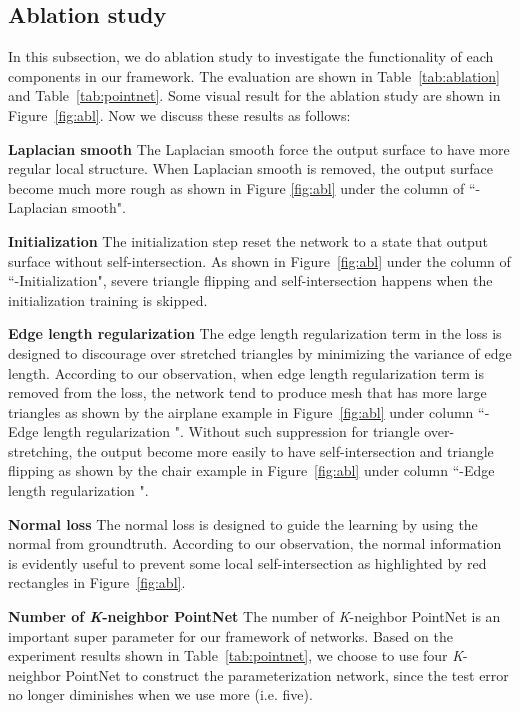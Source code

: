 \subsection{Ablation study}
In this subsection, we do ablation study to investigate the functionality of each components in our framework. The evaluation are shown in Table~\ref{tab:ablation} and Table~\ref{tab:pointnet}. Some visual result for the ablation study are shown in Figure~\ref{fig:abl}. Now we discuss these results as follows:

\noindent\textbf{Laplacian smooth}
The Laplacian smooth force the output surface to have more regular local structure. When Laplacian smooth is removed, the output surface become much more rough as shown in Figure \ref{fig:abl} under the column of ``-Laplacian smooth".

\noindent\textbf{Initialization}
The initialization step reset the network to a state that output surface without self-intersection. As shown in Figure~\ref{fig:abl} under the column of ``-Initialization",  severe triangle flipping and self-intersection happens when the initialization training is skipped.

\noindent\textbf{Edge length regularization}
The edge length regularization term in the loss is designed to discourage over stretched triangles by minimizing the variance of edge length. According to our observation, when edge length regularization term is removed from the loss, the network tend to produce mesh that has  more large triangles as shown by the airplane example in Figure~\ref{fig:abl} under column ``-Edge length regularization ". Without such suppression for triangle over-stretching, the output become more easily to have self-intersection and triangle flipping as shown by the chair example in Figure~\ref{fig:abl} under column ``-Edge length regularization ".

\noindent\textbf{Normal loss}
The normal loss is designed to guide the learning by using the normal from groundtruth. According to our observation, the normal information is evidently useful to prevent some local self-intersection as highlighted by red rectangles in Figure~\ref{fig:abl}.

\noindent\textbf{Number of \textit{K}-neighbor PointNet}
The number of \textit{K}-neighbor PointNet is an important super parameter for our framework of networks. Based on the experiment results shown in Table~\ref{tab:pointnet}, we choose to use four \textit{K}-neighbor PointNet to construct the parameterization network, since the test error no longer diminishes when we use more (i.e. five). 

